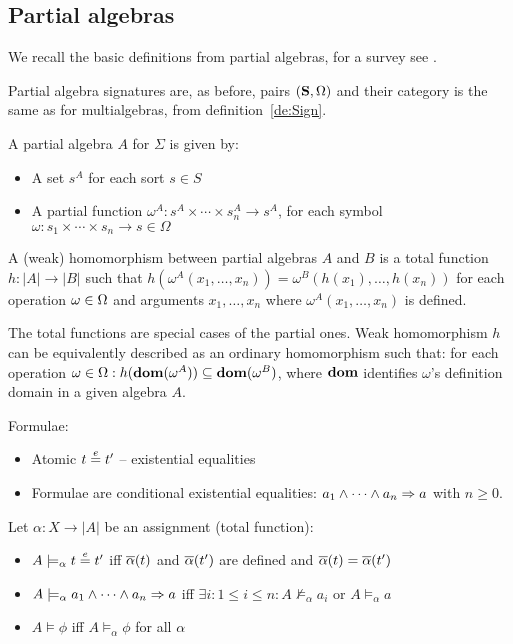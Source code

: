 \documentclass[10pt]{article}
\begin{document}
\subsection{Partial algebras}\label{sub:pa}
We recall the basic definitions from partial algebras, for a survey see \cite{burm,state,mossa}.

Partial algebra signatures are, as before, pairs $({\bf S},\Omega)$ and their 
category is the same as for multialgebras,  from definition~\ref{de:Sign}.
\begin{definition}
A partial algebra $A$ for $\Sigma$ is given by:
\begin{itemize}\MyLPar
\item A set $s^A$ for each sort $s \in S$
\item A partial function $\omega^A: s^A\times\cdots\times s_n^A \to s^A$, for each
symbol $\omega:s_1\times\cdots \times s_n\to s \in \Omega$
\end{itemize}
A (weak) homomorphism between partial algebras $A$ and $B$ is a total function
$h:|A|\to |B|$ such that $h(\omega^A(x_1, \ldots ,x_n))= \omega^B(h(x_1), \ldots ,h(x_n))$
for each operation $\omega\in\Omega$ and arguments $x_1, \ldots ,x_n$ where
$\omega^A(x_1, \ldots ,x_n)$ is defined.
\end{definition}
%
The total functions are special cases of the partial ones. Weak homomorphism $h$ can
be equivalently described as an ordinary homomorphism 
such that: for each
operation $\omega\in\Omega:h({\bf dom}(\omega^A))\subseteq{\bf dom}(\omega^B)$, where
${\bf dom}$ identifies $\omega$'s definition domain in a given algebra $A$.

\begin{definition}Formulae:
\begin{itemize}
\item Atomic $t \stackrel{e}{=} t'$ -- existential equalities
\item Formulae are conditional existential equalities: $a_1
\land \cdots \land a_n \Rightarrow a$ with $n\geq 0$. 
\end{itemize}
\end{definition}

\begin{definition} Let $\alpha:X\to |A|$ be an assignment (total function):
\begin{itemize}
\item $A \models_{\alpha} t \stackrel{e}{=} t'$ iff $\overline{\alpha}(t)$ and
$\overline{\alpha}(t')$ are defined and $\overline{\alpha}(t) =
\overline{\alpha}(t')$ 
\item $A \models_{\alpha} a_1 \land \cdots \land a_n
\Rightarrow a$ iff $\exists i: 1 \leq i \leq n: A {\not \models_{\alpha}}
a_i$ or $A \models_{\alpha} a$ 
\item $A \models \phi$ iff $A\models_{\alpha} \phi$ for all $\alpha$ 
\end{itemize}
\end{definition}
\end{document}
